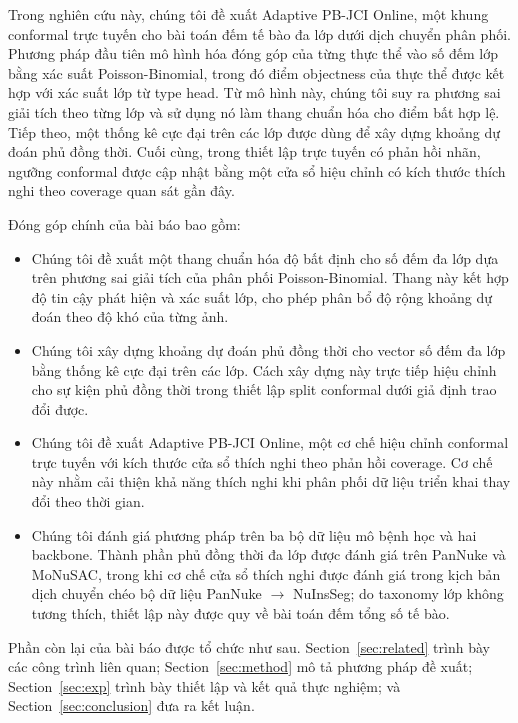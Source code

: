 \documentclass[pdflatex,sn-mathphys-num]{sn-jnl}
\begin{document}
Trong nghiên cứu này, chúng tôi đề xuất Adaptive PB-JCI Online, một khung conformal
trực tuyến cho bài toán đếm tế bào đa lớp dưới dịch chuyển phân phối. Phương pháp
đầu tiên mô hình hóa đóng góp của từng thực thể vào số đếm lớp bằng xác suất
Poisson-Binomial, trong đó điểm objectness của thực thể được kết hợp với xác suất
lớp từ type head. Từ mô hình này, chúng tôi suy ra phương sai giải tích theo từng lớp
và sử dụng nó làm thang chuẩn hóa cho điểm bất hợp lệ. Tiếp theo, một thống kê cực
đại trên các lớp được dùng để xây dựng khoảng dự đoán phủ đồng thời. Cuối cùng, trong
thiết lập trực tuyến có phản hồi nhãn, ngưỡng conformal được cập nhật bằng một cửa
sổ hiệu chỉnh có kích thước thích nghi theo coverage quan sát gần đây.

Đóng góp chính của bài báo bao gồm:
\begin{itemize}
\item Chúng tôi đề xuất một thang chuẩn hóa độ bất định cho số đếm đa lớp dựa trên
phương sai giải tích của phân phối Poisson-Binomial. Thang này kết hợp độ tin cậy
phát hiện và xác suất lớp, cho phép phân bổ độ rộng khoảng dự đoán theo độ khó của
từng ảnh.

\item Chúng tôi xây dựng khoảng dự đoán phủ đồng thời cho vector số đếm đa lớp bằng
thống kê cực đại trên các lớp. Cách xây dựng này trực tiếp hiệu chỉnh cho sự kiện
phủ đồng thời trong thiết lập split conformal dưới giả định trao đổi được.

\item Chúng tôi đề xuất Adaptive PB-JCI Online, một cơ chế hiệu chỉnh conformal trực
tuyến với kích thước cửa sổ thích nghi theo phản hồi coverage. Cơ chế này nhằm cải
thiện khả năng thích nghi khi phân phối dữ liệu triển khai thay đổi theo thời gian.

\item Chúng tôi đánh giá phương pháp trên ba bộ dữ liệu mô bệnh học và hai backbone.
Thành phần phủ đồng thời đa lớp được đánh giá trên PanNuke và MoNuSAC, trong khi cơ
chế cửa sổ thích nghi được đánh giá trong kịch bản dịch chuyển chéo bộ dữ liệu
PanNuke \(\to\) NuInsSeg; do taxonomy lớp không tương thích, thiết lập này được quy
về bài toán đếm tổng số tế bào.
\end{itemize}

Phần còn lại của bài báo được tổ chức như sau. Section~\ref{sec:related} trình bày
các công trình liên quan; Section~\ref{sec:method} mô tả phương pháp đề xuất;
Section~\ref{sec:exp} trình bày thiết lập và kết quả thực nghiệm; và
Section~\ref{sec:conclusion} đưa ra kết luận.
\end{document}
